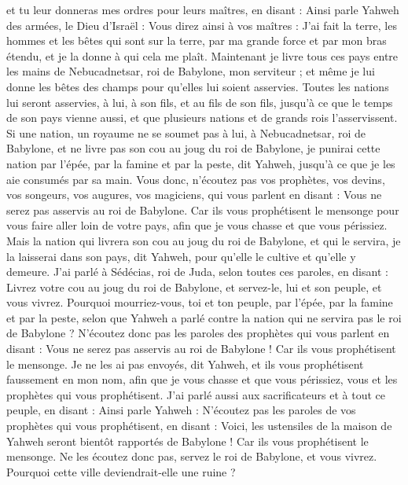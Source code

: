 \begin{multicols}{2}
et tu leur donneras mes ordres pour leurs maîtres, en disant : Ainsi parle Yahweh des armées, le Dieu d'Israël : Vous direz ainsi à vos maîtres :
J'ai fait la terre, les hommes et les bêtes qui sont sur la terre, par ma grande force et par mon bras étendu, et je la donne à qui cela me plaît.
Maintenant je livre tous ces pays entre les mains de Nebucadnetsar, roi de Babylone, mon serviteur ; et même je lui donne les bêtes des champs pour qu'elles lui soient asservies.
Toutes les nations lui seront asservies, à lui, à son fils, et au fils de son fils, jusqu'à ce que le temps de son pays vienne aussi, et que plusieurs nations et de grands rois l'asservissent.
Si une nation, un royaume ne se soumet pas à lui, à Nebucadnetsar, roi de Babylone, et ne livre pas son cou au joug du roi de Babylone, je punirai cette nation par l'épée, par la famine et par la peste, dit Yahweh, jusqu'à ce que je les aie consumés par sa main.
Vous donc, n'écoutez pas vos prophètes, vos devins, vos songeurs, vos augures, vos magiciens, qui vous parlent en disant : Vous ne serez pas asservis au roi de Babylone.
Car ils vous prophétisent le mensonge pour vous faire aller loin de votre pays, afin que je vous chasse et que vous périssiez.
Mais la nation qui livrera son cou au joug du roi de Babylone, et qui le servira, je la laisserai dans son pays, dit Yahweh, pour qu'elle le cultive et qu'elle y demeure.
J'ai parlé à Sédécias, roi de Juda, selon toutes ces paroles, en disant : Livrez votre cou au joug du roi de Babylone, et servez-le, lui et son peuple, et vous vivrez.
Pourquoi mourriez-vous, toi et ton peuple, par l'épée, par la famine et par la peste, selon que Yahweh a parlé contre la nation qui ne servira pas le roi de Babylone ?
N'écoutez donc pas les paroles des prophètes qui vous parlent en disant : Vous ne serez pas asservis au roi de Babylone ! Car ils vous prophétisent le mensonge.
Je ne les ai pas envoyés, dit Yahweh, et ils vous prophétisent faussement en mon nom, afin que je vous chasse et que vous périssiez, vous et les prophètes qui vous prophétisent.
J'ai parlé aussi aux sacrificateurs et à tout ce peuple, en disant : Ainsi parle Yahweh : N'écoutez pas les paroles de vos prophètes qui vous prophétisent, en disant : Voici, les ustensiles de la maison de Yahweh seront bientôt rapportés de Babylone ! Car ils vous prophétisent le mensonge.
Ne les écoutez donc pas, servez le roi de Babylone, et vous vivrez. Pourquoi cette ville deviendrait-elle une ruine ?

\end{multicols}
